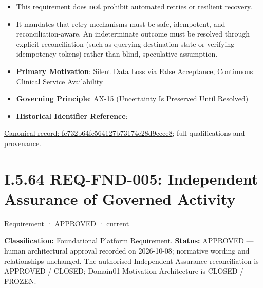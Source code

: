 \begin{itemize}


\item This requirement does \textbf{not} prohibit automated retries or resilient recovery.

\item 

It mandates that retry mechanisms must be safe, idempotent, and reconciliation-aware. An indeterminate outcome must be resolved through explicit reconciliation (such as querying destination state or verifying idempotency tokens) rather than blind, speculative assumption.




\item 

\textbf{Primary Motivation}: \href{\detokenize{../../../../../docs/markdown/01-motivation/drivers-assessments/assessments.md}}{Silent Data Loss via False Acceptance}, \href{\detokenize{../../../../../docs/markdown/01-motivation/drivers-assessments/drivers.md}}{Continuous Clinical Service Availability}




\item \textbf{Governing Principle}: \hyperref[element:ef8abbaec37e4890ad78b9f263e67906]{AX-15 (Uncertainty Is Preserved Until Resolved)}

\item \textbf{Historical Identifier Reference}: \texttt{}

\end{itemize}

{\footnotesize \href{../../../../continuum/motivation/requirement/fc732b64fc564127b73174e28d9ccce8.md}{Canonical record: fc732b64fc564127b73174e28d9ccce8}; full qualifications and provenance.}\par
\section*{I.5.64 REQ-FND-005: Independent Assurance of Governed Activity}
\label{navigation:I.5.64}

\label{element:bbb7438e78604308abba93afc14f4e2e}
{\small Requirement · APPROVED · current}\par

\textbf{Classification:} Foundational Platform Requirement. \textbf{Status:} APPROVED — human architectural approval recorded on 2026-10-08; normative wording and relationships unchanged. The authorised Independent Assurance reconciliation is APPROVED / CLOSED; Domain01 Motivation Architecture is CLOSED / FROZEN.



